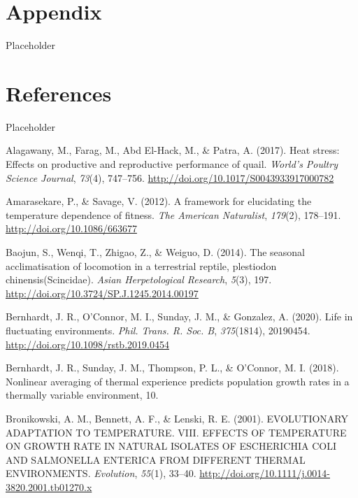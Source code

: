 \documentclass[12pt,twoside]{reedthesis}
\begin{document}
\hypertarget{appendix}{%
\chapter*{Appendix}\label{appendix}}

Placeholder

\hypertarget{references}{%
\chapter*{References}\label{references}}

Placeholder

\hypertarget{refs}{}
\leavevmode\hypertarget{ref-alagawany_heat_2017}{}%
Alagawany, M., Farag, M., Abd El-Hack, M., \& Patra, A. (2017). Heat stress: Effects on productive and reproductive performance of quail. \emph{World's Poultry Science Journal}, \emph{73}(4), 747--756. \url{http://doi.org/10.1017/S0043933917000782}

\leavevmode\hypertarget{ref-amarasekare_framework_2012}{}%
Amarasekare, P., \& Savage, V. (2012). A framework for elucidating the temperature dependence of fitness. \emph{The American Naturalist}, \emph{179}(2), 178--191. \url{http://doi.org/10.1086/663677}

\leavevmode\hypertarget{ref-baojun_seasonal_2014}{}%
Baojun, S., Wenqi, T., Zhigao, Z., \& Weiguo, D. (2014). The seasonal acclimatisation of locomotion in a terrestrial reptile, plestiodon chinensis(Scincidae). \emph{Asian Herpetological Research}, \emph{5}(3), 197. \url{http://doi.org/10.3724/SP.J.1245.2014.00197}

\leavevmode\hypertarget{ref-bernhardt_life_2020}{}%
Bernhardt, J. R., O'Connor, M. I., Sunday, J. M., \& Gonzalez, A. (2020). Life in fluctuating environments. \emph{Phil. Trans. R. Soc. B}, \emph{375}(1814), 20190454. \url{http://doi.org/10.1098/rstb.2019.0454}

\leavevmode\hypertarget{ref-bernhardt_nonlinear_2018}{}%
Bernhardt, J. R., Sunday, J. M., Thompson, P. L., \& O'Connor, M. I. (2018). Nonlinear averaging of thermal experience predicts population growth rates in a thermally variable environment, 10.

\leavevmode\hypertarget{ref-bronikowski_evolutionary_2001}{}%
Bronikowski, A. M., Bennett, A. F., \& Lenski, R. E. (2001). EVOLUTIONARY ADAPTATION TO TEMPERATURE. VIII. EFFECTS OF TEMPERATURE ON GROWTH RATE IN NATURAL ISOLATES OF ESCHERICHIA COLI AND SALMONELLA ENTERICA FROM DIFFERENT THERMAL ENVIRONMENTS. \emph{Evolution}, \emph{55}(1), 33--40. \url{http://doi.org/10.1111/j.0014-3820.2001.tb01270.x}
\end{document}
